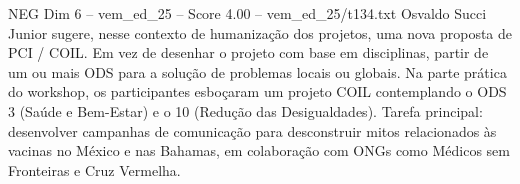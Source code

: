 \begin{textsample}{NEG Dim 6 – vem\_ed\_25 – Score 4.00 – vem\_ed\_25/t134.txt}
Osvaldo Succi Junior sugere, nesse contexto de humanização dos projetos, uma nova proposta de PCI / COIL.
Em vez de desenhar o projeto com base em disciplinas, partir de um ou mais ODS para a solução de problemas locais ou globais.
Na parte prática do workshop, os participantes esboçaram um projeto COIL contemplando o ODS 3 (Saúde e Bem-Estar) e o 10 (Redução das Desigualdades).
Tarefa principal: desenvolver campanhas de comunicação para desconstruir mitos relacionados às vacinas no México e nas Bahamas, em colaboração com ONGs como Médicos sem Fronteiras e Cruz Vermelha.

\end{textsample}
